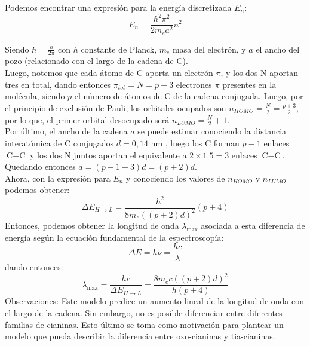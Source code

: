 \documentclass[12pt,a4paper,twocolumn]{informeUNLP} %
\begin{document}
Podemos encontrar una expresión para la energía discretizada $E_n$:
$$E_n=\frac{\hbar^2\pi^2}{2m_ea^2}n^2$$

Siendo $\hbar=\frac{h}{2\pi}$ con $h$ constante de Planck, $m_e$ masa del electrón, y $a$ el ancho del pozo (relacionado con el largo de la cadena de C).\\
Luego, notemos que cada átomo de C aporta un electrón $\pi$, y los dos N aportan tres en total, dando entonces $\pi_{tot}=N=p+3$ electrones $\pi$ presentes en la molécula, siendo $p$ el número de átomos de C de la cadena conjugada. Luego, por el principio de exclusión de Pauli, los orbitales ocupados son $n_{HOMO}=\frac{N}{2}=\frac{p+3}{2}$, por lo que, el primer orbital desocupado será $n_{LUMO}=\frac{N}{2}+1$. \\Por último, el ancho de la cadena $a$ se puede estimar conociendo la distancia interatómica de C conjugados $d=0,14$ nm \cite{roberts1977}, luego los C forman $p-1$ enlaces $\text{C}-\text{C}$ y los dos N juntos aportan el equivalente a $2 \times 1.5 = 3$ enlaces $\text{C}-\text{C}$. Quedando entonces $a=(p-1+3)d=(p+2)d$.\\
Ahora, con la expresión para $E_n$ y conociendo los valores de $n_{HOMO }$ y $n_{LUMO}$ podemos obtener:
$$\Delta E_{H\rightarrow L}=\frac{h^2}{8m_e((p+2)d)^2}(p+4)$$
Entonces, podemos obtener la longitud de onda $\lambda_{\max}$ asociada a esta diferencia de energía según la ecuación fundamental de la espectroscopía:
$$\Delta E=h\nu=\frac{hc}{\lambda}$$
dando entonces:
$$\lambda_{\max}=\frac{hc}{\Delta E_{H\rightarrow L}}=\frac{8m_ec((p+2)d)^2}{h(p+4)}$$
Observaciones: Este modelo predice un aumento lineal de la longitud de onda con el largo de la cadena. Sin embargo, no es posible diferenciar entre diferentes familias de cianinas. Esto último se toma como motivación para plantear un modelo que pueda describir la diferencia entre oxo-cianinas y tia-cianinas.
\end{document}
